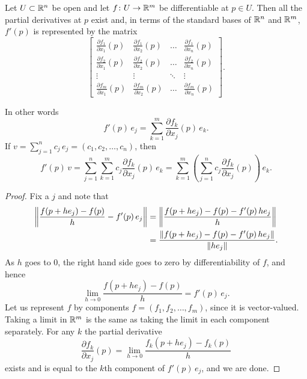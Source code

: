\begin{prop} \label{mv:prop:jacobianmatrix}
Let $U \subset {\mathbb{R}}^n$ be open and let $f \colon U \to {\mathbb{R}}^m$ be
differentiable at $p \in U$.  Then all the partial derivatives at $p$
exist and, in terms of the standard bases of ${\mathbb{R}}^n$ and ${\mathbb{R}}^m$,
$f'(p)$ is represented by the matrix
\begin{equation*}
\begin{bmatrix}
\frac{\partial f_1}{\partial x_1}(p)
&
\frac{\partial f_1}{\partial x_2}(p)
& \ldots &
\frac{\partial f_1}{\partial x_n}(p)
\\[6pt]
\frac{\partial f_2}{\partial x_1}(p)
&
\frac{\partial f_2}{\partial x_2}(p)
& \ldots &
\frac{\partial f_2}{\partial x_n}(p)
\\
\vdots & \vdots & \ddots & \vdots
\\
\frac{\partial f_m}{\partial x_1}(p)
&
\frac{\partial f_m}{\partial x_2}(p)
& \ldots &
\frac{\partial f_m}{\partial x_n}(p)
\end{bmatrix} .
\end{equation*}
\end{prop}


In other words
\begin{equation*}
f'(p) \, e_j =
\sum_{k=1}^m
\frac{\partial f_k}{\partial x_j}(p) \,e_k .
\end{equation*}
If $v = \sum_{j=1}^n c_j\, e_j = (c_1,c_2,\ldots,c_n)$, then
\begin{equation*}
f'(p) \, v =
\sum_{j=1}^n
\sum_{k=1}^m
 c_j
\frac{\partial f_k}{\partial x_j}(p) \,e_k
=
\sum_{k=1}^m
\left(
\sum_{j=1}^n
 c_j
\frac{\partial f_k}{\partial x_j}(p) \right) \,e_k .
\end{equation*}

\begin{proof}
Fix a $j$ and note that
\begin{equation*}
\begin{split}
\left\lVert {\frac{f(p+h e_j)-f(p)}{h} - f'(p) \, e_j} \right\rVert & = 
\left\lVert {\frac{f(p+h e_j)-f(p) - f'(p) \, h e_j}{h}} \right\rVert \\
& =
\frac{\lVert {f(p+h e_j)-f(p) - f'(p) \, h e_j} \rVert}{\lVert {h e_j} \rVert} .
\end{split}
\end{equation*}
As $h$ goes to 0, the right hand side goes to zero by
differentiability of $f$, and hence
\begin{equation*}
\lim_{h \to 0}
\frac{f(p+h e_j)-f(p)}{h} = f'(p) \, e_j  .
\end{equation*}
Let us represent $f$ by components
$f = (f_1,f_2,\ldots,f_m)$, since it is vector-valued.
Taking a limit in ${\mathbb{R}}^m$
is the same as taking the limit in each component separately.  
For any $k$
the partial derivative
\begin{equation*}
\frac{\partial f_k}{\partial x_j} (p)
=
\lim_{h \to 0}
\frac{f_k(p+h e_j)-f_k(p)}{h}
\end{equation*}
exists and 
is equal to the $k$th component of $f'(p)\, e_j$, and we are done.
\end{proof}

